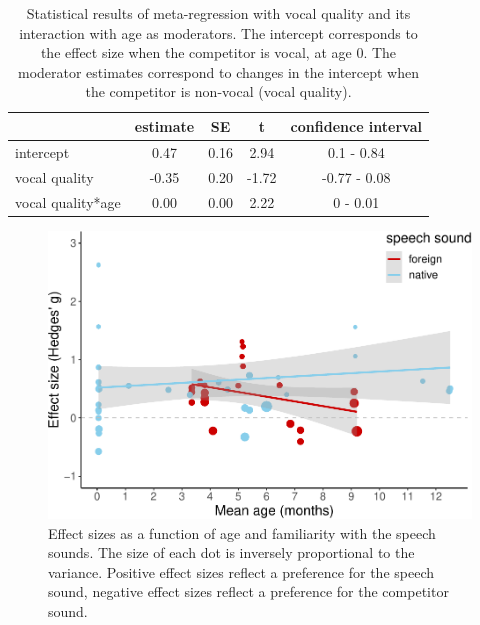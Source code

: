 \documentclass[
  english,
  man]{apa6}
\begin{document}
\begin{table}[tbp]

\begin{center}
\begin{threeparttable}

\caption{\label{tab:TableVocal}Statistical results of meta-regression with vocal quality and its interaction with age as moderators. The intercept corresponds to the effect size when the competitor is vocal, at age 0. The moderator estimates correspond to changes in the intercept when the competitor is non-vocal (vocal quality).}

\begin{tabular}{lcccc}
\toprule
 & estimate & SE & t & confidence interval\\
\midrule
intercept & 0.47 & 0.16 & 2.94 & 0.1 - 0.84\\
vocal quality & -0.35 & 0.20 & -1.72 & -0.77 - 0.08\\
vocal quality*age & 0.00 & 0.00 & 2.22 & 0 - 0.01\\
\bottomrule
\end{tabular}

\end{threeparttable}
\end{center}

\end{table}

\begin{figure}
\centering
\includegraphics{MA_speech_pref_files/figure-latex/lang-1.pdf}
\caption{\label{fig:lang}Effect sizes as a function of age and familiarity with the speech sounds. The size of each dot is inversely proportional to the variance. Positive effect sizes reflect a preference for the speech sound, negative effect sizes reflect a preference for the competitor sound.}
\end{figure}
\end{document}
